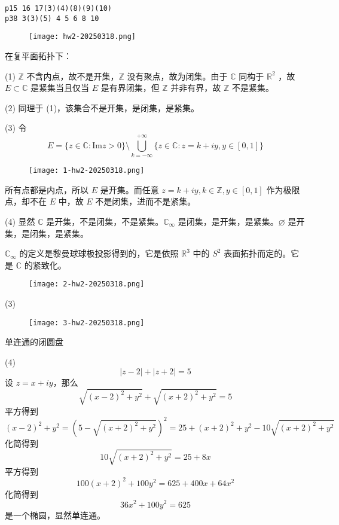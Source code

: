 \begin{lstlisting}
p15 16 17(3)(4)(8)(9)(10)
p38 3(3)(5) 4 5 6 8 10    
\end{lstlisting}
\begin{figure}[H]
\centering
\texttt{[image: hw2-20250318.png]}
\label{}
\end{figure}

在复平面拓扑下：

(1) $\mathbb{Z}$ 不含内点，故不是开集，$\mathbb{Z}$ 没有聚点，故为闭集。由于 $\mathbb{C}$ 同构于 $\mathbb{R}^{2}$ ，故 $E\subset \mathbb{C}$ 是紧集当且仅当 $E$ 是有界闭集，但 $\mathbb{Z}$ 并非有界，故 $\mathbb{Z}$ 不是紧集。

(2) 同理于 (1)，该集合不是开集，是闭集，是紧集。

(3) 令
\[
E=\{ z\in \mathbb{C} :\mathrm{Im}z>0\}\setminus \bigcup_{k=-\infty}^{+\infty} \{ z\in \mathbb{C}:z=k+iy,y\in[0,1] \}
\]
\begin{figure}[H]
\centering
\texttt{[image: 1-hw2-20250318.png]}
\label{}
\end{figure}

所有点都是内点，所以 $E$ 是开集。而任意 $z=k+iy, k\in \mathbb{Z}, y\in[0,1]$ 作为极限点，却不在 $E$ 中，故 $E$ 不是闭集，进而不是紧集。

(4) 显然 $\mathbb{C}$ 是开集，不是闭集，不是紧集。$\mathbb{C}_{\infty}$ 是闭集，是开集，是紧集。$\varnothing$ 是开集，是闭集，是紧集。

\begin{remark}
$\mathbb{C}_{\infty}$ 的定义是黎曼球球极投影得到的，它是依照 $\mathbb{R}^{3}$ 中的 $S^2$ 表面拓扑而定的。它是 $\mathbb{C}$ 的紧致化。
\end{remark}
\begin{figure}[H]
\centering
\texttt{[image: 2-hw2-20250318.png]}
\label{}
\end{figure}

(3)
\begin{figure}[H]
\centering
\texttt{[image: 3-hw2-20250318.png]}
\label{}
\end{figure}
单连通的闭圆盘

(4)
\[
\lvert z-2 \rvert +\lvert z+2 \rvert =5
\]
设 $z=x+iy$，那么
\[
\sqrt{ (x-2)^{2}+y^{2} }+\sqrt{ (x+2)^{2}+y^{2} }=5
\]
平方得到
\[
(x-2)^{2}+y^{2}=(5-\sqrt{ (x+2)^{2}+y^{2} })^{2}=25+(x+2)^{2}+y^{2}-10\sqrt{ (x+2)^{2}+y^{2} }
\]
化简得到
\[
10\sqrt{ (x+2)^{2}+y^{2} }=25+8x
\]
平方得到
\[
100(x+2)^{2}+100y^{2}=625+400x+64x^{2}
\]
化简得到
\[
36x^{2}+100y^{2}=625
\]
是一个椭圆，显然单连通。

